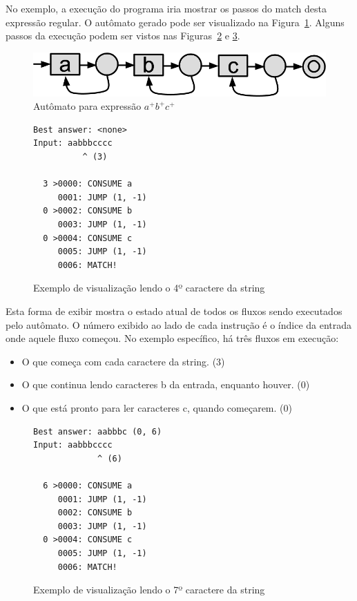 \documentclass[a4paper,12pt,oneside,onecolumn]{uerj}
\begin{document}
No exemplo, a execução do programa iria mostrar os passos do match desta expressão regular. O autômato gerado pode ser visualizado na Figura~\ref{fig:view_automaton}. Alguns passos da execução podem ser vistos nas Figuras~\ref{fig:exemplo_view_passo_3} e \ref{fig:exemplo_view_passo_6}.

\begin{figure}[!htbp]
  \centering
  \includegraphics[scale=0.35]{figures/view_automaton.png}
  \caption{Autômato para expressão $a^+b^+c^+$}
  \label{fig:view_automaton}
\end{figure}

\begin{figure}[!htbp]
  \centering
\begin{verbatim}
Best answer: <none>
Input: aabbbcccc
          ^ (3)

  3 >0000: CONSUME a
     0001: JUMP (1, -1)
  0 >0002: CONSUME b
     0003: JUMP (1, -1)
  0 >0004: CONSUME c
     0005: JUMP (1, -1)
     0006: MATCH!
\end{verbatim}
  \caption{Exemplo de visualização lendo o 4º caractere da string}
  \label{fig:exemplo_view_passo_3}
\end{figure}

Esta forma de exibir mostra o estado atual de todos os fluxos sendo executados pelo autômato. O número exibido ao lado de cada instrução é o índice da entrada onde aquele fluxo começou. No exemplo específico, há três fluxos em execução: 

\begin{itemize}
\item{O que começa com cada caractere da string. (3)}
\item{O que continua lendo caracteres b da entrada, enquanto houver. (0)}
\item{O que está pronto para ler caracteres c, quando começarem. (0)}
\end{itemize}


\begin{figure}[!htbp]
  \centering
\begin{verbatim}
Best answer: aabbbc (0, 6)
Input: aabbbcccc
             ^ (6)

  6 >0000: CONSUME a
     0001: JUMP (1, -1)
     0002: CONSUME b
     0003: JUMP (1, -1)
  0 >0004: CONSUME c
     0005: JUMP (1, -1)
     0006: MATCH!
\end{verbatim}
  \caption{Exemplo de visualização lendo o 7º caractere da string}
  \label{fig:exemplo_view_passo_6}
\end{figure}
\end{document}
